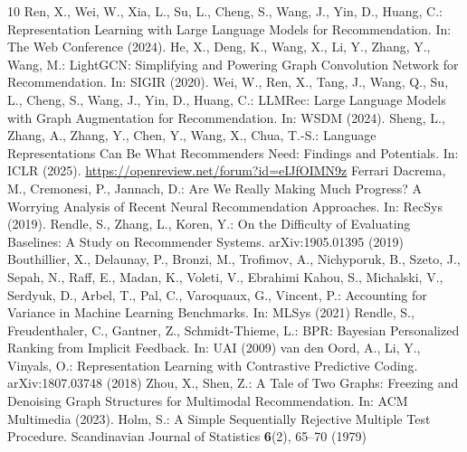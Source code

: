 \documentclass[runningheads]{llncs}
\begin{document}
\clearpage
\begin{thebibliography}{10}
 Ren, X., Wei, W., Xia, L., Su, L., Cheng, S., Wang, J., Yin, D.,
Huang, C.: Representation Learning with Large Language Models for Recommendation.
In: The Web Conference (2024). 
 He, X., Deng, K., Wang, X., Li, Y., Zhang, Y., Wang, M.:
LightGCN: Simplifying and Powering Graph Convolution Network for Recommendation.
In: SIGIR (2020). 
 Wei, W., Ren, X., Tang, J., Wang, Q., Su, L., Cheng, S., Wang, J.,
Yin, D., Huang, C.: LLMRec: Large Language Models with Graph Augmentation for
Recommendation. In: WSDM (2024). 
 Sheng, L., Zhang, A., Zhang, Y., Chen, Y., Wang, X., Chua, T.-S.:
Language Representations Can Be What Recommenders Need: Findings and Potentials.
In: ICLR (2025). \url{https://openreview.net/forum?id=eIJfOIMN9z}
 Ferrari Dacrema, M., Cremonesi, P., Jannach, D.: Are We Really
Making Much Progress? A Worrying Analysis of Recent Neural Recommendation
Approaches. In: RecSys (2019). 
 Rendle, S., Zhang, L., Koren, Y.: On the Difficulty of
Evaluating Baselines: A Study on Recommender Systems. arXiv:1905.01395 (2019)
 Bouthillier, X., Delaunay, P., Bronzi, M., Trofimov, A.,
Nichyporuk, B., Szeto, J., Sepah, N., Raff, E., Madan, K., Voleti, V., Ebrahimi
Kahou, S., Michalski, V., Serdyuk, D., Arbel, T., Pal, C., Varoquaux, G.,
Vincent, P.: Accounting for Variance in Machine Learning Benchmarks. In: MLSys
(2021)
 Rendle, S., Freudenthaler, C., Gantner, Z., Schmidt-Thieme, L.: BPR:
Bayesian Personalized Ranking from Implicit Feedback. In: UAI (2009)
 van den Oord, A., Li, Y., Vinyals, O.: Representation Learning
with Contrastive Predictive Coding. arXiv:1807.03748 (2018)
 Zhou, X., Shen, Z.: A Tale of Two Graphs: Freezing and Denoising
Graph Structures for Multimodal Recommendation. In: ACM Multimedia (2023).
 Holm, S.: A Simple Sequentially Rejective Multiple Test Procedure.
Scandinavian Journal of Statistics \textbf{6}(2), 65--70 (1979)
\end{thebibliography}
\end{document}
